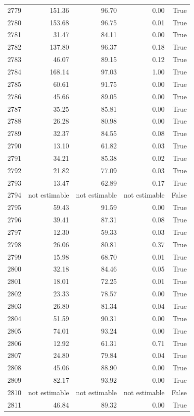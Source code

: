 \begin{longtable}{rrrrr}
2779 & 151.36 & 96.70 & 0.00 & True \\
2780 & 153.68 & 96.75 & 0.01 & True \\
2781 & 31.47 & 84.11 & 0.00 & True \\
2782 & 137.80 & 96.37 & 0.18 & True \\
2783 & 46.07 & 89.15 & 0.12 & True \\
2784 & 168.14 & 97.03 & 1.00 & True \\
2785 & 60.61 & 91.75 & 0.00 & True \\
2786 & 45.66 & 89.05 & 0.00 & True \\
2787 & 35.25 & 85.81 & 0.00 & True \\
2788 & 26.28 & 80.98 & 0.00 & True \\
2789 & 32.37 & 84.55 & 0.08 & True \\
2790 & 13.10 & 61.82 & 0.03 & True \\
2791 & 34.21 & 85.38 & 0.02 & True \\
2792 & 21.82 & 77.09 & 0.03 & True \\
2793 & 13.47 & 62.89 & 0.17 & True \\
2794 & not estimable & not estimable & not estimable & False \\
2795 & 59.43 & 91.59 & 0.00 & True \\
2796 & 39.41 & 87.31 & 0.08 & True \\
2797 & 12.30 & 59.33 & 0.03 & True \\
2798 & 26.06 & 80.81 & 0.37 & True \\
2799 & 15.98 & 68.70 & 0.01 & True \\
2800 & 32.18 & 84.46 & 0.05 & True \\
2801 & 18.01 & 72.25 & 0.01 & True \\
2802 & 23.33 & 78.57 & 0.00 & True \\
2803 & 26.80 & 81.34 & 0.04 & True \\
2804 & 51.59 & 90.31 & 0.00 & True \\
2805 & 74.01 & 93.24 & 0.00 & True \\
2806 & 12.92 & 61.31 & 0.71 & True \\
2807 & 24.80 & 79.84 & 0.04 & True \\
2808 & 45.06 & 88.90 & 0.00 & True \\
2809 & 82.17 & 93.92 & 0.00 & True \\
2810 & not estimable & not estimable & not estimable & False \\
2811 & 46.84 & 89.32 & 0.00 & True \\

\end{longtable}
